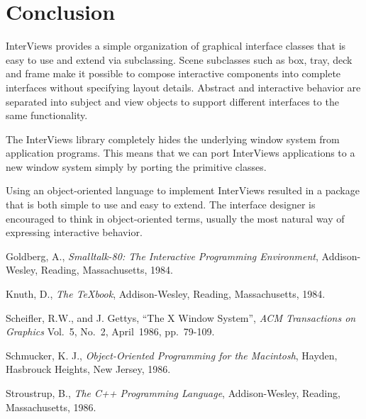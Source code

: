 \section{Conclusion}
InterViews provides a simple organization
of graphical interface classes that is easy to use and
extend via subclassing.
Scene subclasses such as box, tray, deck and frame make it possible to
compose interactive components into complete interfaces without
specifying layout details.  Abstract and interactive
behavior are separated into subject and view objects to support different
interfaces to the same functionality.

The InterViews library completely hides the underlying window system
from application programs.
This means that we can port InterViews applications
to a new window system simply by porting the primitive classes.

Using an object-oriented language to implement InterViews resulted in a
package that is both simple to use and easy to extend.  The interface designer
is encouraged to think in object-oriented terms, usually the
most natural way of expressing interactive behavior.

\begin{thebibliography}{99}
\markboth{}{}


 Goldberg, A.,
{\em Smalltalk-80: The Interactive Programming Environment\/},
Addison-Wesley, Reading, Massachusetts, 1984.

 Knuth, D.,
{\em The \TeX book},
Addison-Wesley, Reading, Massachusetts, 1984.


 Scheifler, R.W., and J. Gettys,
``The X Window System'',
{\em ACM Transactions on Graphics\/} Vol.~5, No.~2, April~1986, pp.~79-109.

 Schmucker, K. J.,
{\em Object-Oriented Programming for the Macintosh\/},
Hayden, Hasbrouck Heights, New Jersey, 1986.


 Stroustrup, B.,
{\em The C++ Programming Language\/},
Addison-Wesley, Reading, Massachusetts, 1986.

\end{thebibliography}

